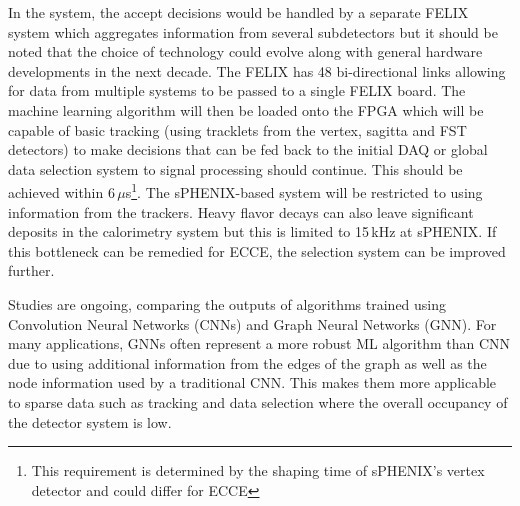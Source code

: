 In the system, the accept decisions would be handled by a separate FELIX system which aggregates information from several subdetectors but it should be noted that the choice of technology could evolve along with general hardware developments in the next decade. The FELIX has 48 bi-directional links allowing for data from multiple systems to be passed to a single FELIX board. The machine learning algorithm will then be loaded onto the FPGA which will be capable of basic tracking (using tracklets from the vertex, sagitta and FST detectors) to make decisions that can be fed back to the initial DAQ or global data selection system to signal processing should continue. This should be achieved within 6$\,\mu$s\footnote{This requirement is determined by the shaping time of sPHENIX's vertex detector and could differ for ECCE}. The sPHENIX-based system will be restricted to using information from the trackers. Heavy flavor decays can also leave significant deposits in the calorimetry system but this is limited to 15\,kHz at sPHENIX. If this bottleneck can be remedied for ECCE, the selection system can be improved further. %

%		

Studies are ongoing, comparing the outputs of algorithms trained using Convolution Neural Networks (CNNs) and Graph Neural Networks (GNN). For many applications, GNNs often represent a more robust ML algorithm than CNN due to using additional information from the edges of the graph as well as the node information used by a traditional CNN. This makes them more applicable to sparse data such as tracking and data selection where the overall occupancy of the detector system is low.


